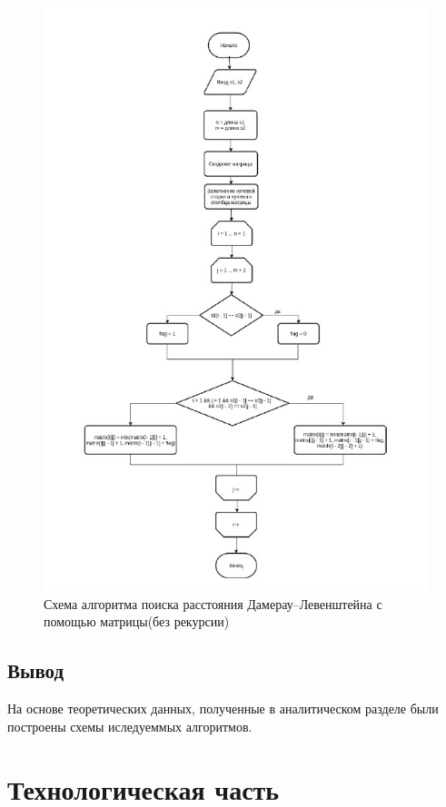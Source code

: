\documentclass[12pt]{report}
\begin{document}
\begin{figure}[h]
	\centering
	\includegraphics[scale=1]{dlmtrx.jpg}
	\caption{Схема алгоритма поиска расстояния Дамерау–Левенштейна
		с помощью матрицы(без рекурсии)}
	\label{fig:mpr}
\end{figure}

\newpage

\section{Вывод}
	На основе теоретических данных, полученные в аналитическом разделе были построены схемы иследуеммых  алгоритмов.

\chapter{Технологическая часть}
\end{document}
